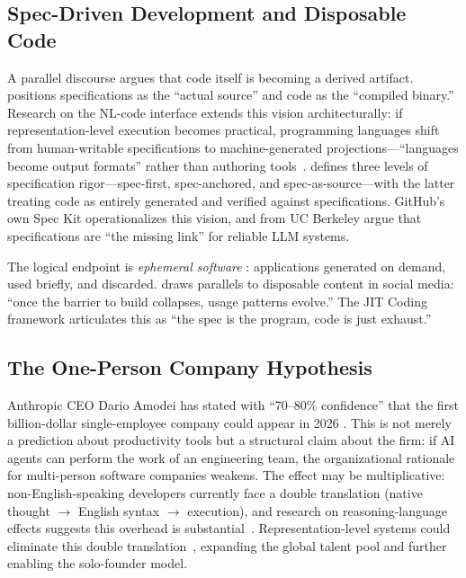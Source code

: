 \documentclass[sigconf, nonacm, anonymous=false]{acmart}
\begin{document}
\subsection{Spec-Driven Development and Disposable Code}

A parallel discourse argues that code itself is becoming a derived artifact. \citet{welch2025disposable} positions specifications as the ``actual source'' and code as the ``compiled binary.'' Research on the NL-code interface extends this vision architecturally: if representation-level execution becomes practical, programming languages shift from human-writable specifications to machine-generated projections---``languages become output formats'' rather than authoring tools~\citep{zgap2026chomsky}. \citet{piskala2026sdd} defines three levels of specification rigor---spec-first, spec-anchored, and spec-as-source---with the latter treating code as entirely generated and verified against specifications. GitHub's own Spec Kit \citep{github2025speckit} operationalizes this vision, and \citet{stoica2024specifications} from UC Berkeley argue that specifications are ``the missing link'' for reliable LLM systems.

The logical endpoint is \textit{ephemeral software} \citep{ellis2025ephemeral, houston2025ephemeral, ali2025ephemeral}: applications generated on demand, used briefly, and discarded. \citet{harel2025disposable} draws parallels to disposable content in social media: ``once the barrier to build collapses, usage patterns evolve.'' The JIT Coding framework \citep{playbooks2025jit} articulates this as ``the spec is the program, code is just exhaust.''

\subsection{The One-Person Company Hypothesis}

Anthropic CEO Dario Amodei has stated with ``70--80\% confidence'' that the first billion-dollar single-employee company could appear in 2026 \citep{nxcode2026unicorn}. This is not merely a prediction about productivity tools but a structural claim about the firm: if AI agents can perform the work of an engineering team, the organizational rationale for multi-person software companies weakens. The effect may be multiplicative: non-English-speaking developers currently face a double translation (native thought $\to$ English syntax $\to$ execution), and research on reasoning-language effects suggests this overhead is substantial~\citep{li2026reasoning}. Representation-level systems could eliminate this double translation~\citep{zgap2026chomsky}, expanding the global talent pool and further enabling the solo-founder model.
\end{document}
